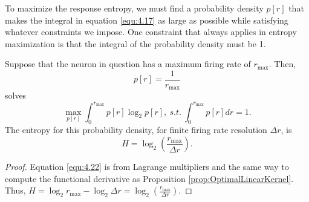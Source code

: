 \begin{rem}
  To maximize the response entropy, we must find a probability density $p[r]$
that makes the integral in equation \ref{equ:4.17} as large as possible while satisfying whatever constraints we impose. One constraint that always
applies in entropy maximization is that the integral of the
probability density must be 1.
\end{rem}


\begin{prop}
  \label{prop:solveForMaximum}
  Suppose that the neuron in question has a maximum firing rate of $r_{\max}$. Then, 
  \begin{equation}
    \label{equ:4.22}
    p[r]=\frac{1}{r_{{\max}}}
  \end{equation}
  solves
  \begin{equation}
    \label{equ:4.20}
    \max\limits_{p[r]} \int_{0}^{r_{{\max}}}p[r]\log_2p[r],\ s.t.\ \int_{0}^{r_{{\max}}}p[r]dr=1.
  \end{equation}
  The entropy for this probability density, for finite firing rate resolution $\Delta r$, is
  \begin{equation}
    \label{equ:4.23}
    H=\log_2\left( \frac{r_{{\max}}}{\Delta r} \right).
  \end{equation}
  \begin{proof}
    Equation \ref{equ:4.22} is from Lagrange multipliers and the same way to compute the functional derivative as Proposition \ref{prop:OptimalLinearKernel}. Thus, $H=\log_2r_{{\max}}-\log_2\Delta r=\log_2\left( \frac{r_{{\max}}}{\Delta r} \right)$.
  \end{proof}
\end{prop}

